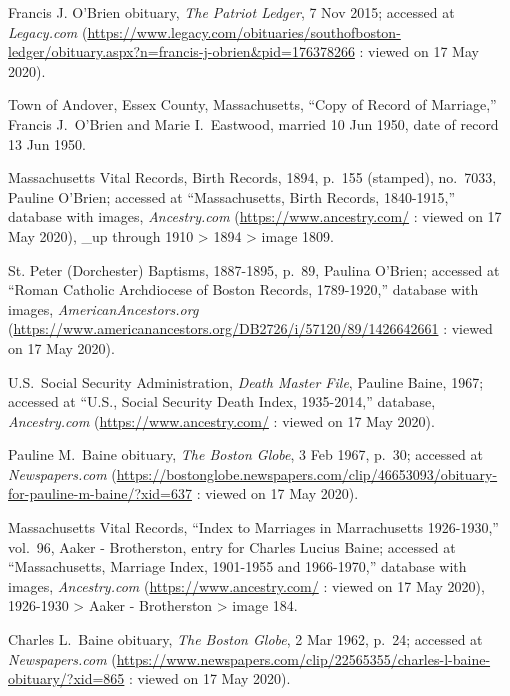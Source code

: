 \begin{thebibliography}{999}
	Francis J. O'Brien obituary, \textit{The Patriot Ledger}, 7 Nov 2015; accessed at \textit{Legacy.com} (\url{https://www.legacy.com/obituaries/southofboston-ledger/obituary.aspx?n=francis-j-obrien\&pid=176378266} : viewed on 17 May 2020).
	
	Town of Andover, Essex County, Massachusetts, ``Copy of Record of Marriage,'' Francis J.\ O'Brien and Marie I.\ Eastwood, married 10 Jun 1950, date of record 13 Jun 1950.
	
	Massachusetts Vital Records, Birth Records, 1894, p.\ 155 (stamped), no.\ 7033, Pauline O'Brien; accessed at ``Massachusetts, Birth Records, 1840-1915,'' database with images, \textit{Ancestry.com} (\url{https://www.ancestry.com/} : viewed on 17 May 2020), \_up through 1910 > 1894 > image 1809.

	St. Peter (Dorchester) Baptisms, 1887-1895, p.\ 89, Paulina O'Brien; accessed at ``Roman Catholic Archdiocese of Boston Records, 1789-1920,'' database with images, \textit{AmericanAncestors.org} (\url{https://www.americanancestors.org/DB2726/i/57120/89/1426642661} : viewed on 17 May 2020).
	
	U.S.\ Social Security Administration, \textit{Death Master File}, Pauline Baine, 1967; accessed at ``U.S., Social Security Death Index, 1935-2014,'' database, \textit{Ancestry.com} (\url{https://www.ancestry.com/} : viewed on 17 May 2020).
	
	Pauline M.\ Baine obituary, \textit{The Boston Globe}, 3 Feb 1967, p.\ 30; accessed at \textit{Newspapers.com} (\url{https://bostonglobe.newspapers.com/clip/46653093/obituary-for-pauline-m-baine/?xid=637} : viewed on 17 May 2020).
	
	Massachusetts Vital Records, ``Index to Marriages in Marrachusetts 1926-1930,'' vol.\ 96, Aaker - Brotherston, entry for Charles Lucius Baine; accessed at ``Massachusetts, Marriage Index, 1901-1955 and 1966-1970,'' database with images, \textit{Ancestry.com} (\url{https://www.ancestry.com/} : viewed on 17 May 2020), 1926-1930 > Aaker - Brotherston > image 184.
	
	Charles L.\ Baine obituary, \textit{The Boston Globe}, 2 Mar 1962, p.\ 24; accessed at \textit{Newspapers.com} (\url{https://www.newspapers.com/clip/22565355/charles-l-baine-obituary/?xid=865} : viewed on 17 May 2020).
	

\end{thebibliography}
